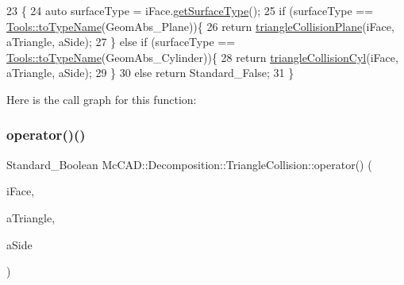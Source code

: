 \begin{DoxyCode}
23                                 \{
24     \textcolor{keyword}{auto} surfaceType = iFace.\hyperlink{classMcCAD_1_1Geometry_1_1Surface_ac81308cae2d3fd458dfa311adea23688}{getSurfaceType}();
25     \textcolor{keywordflow}{if} (surfaceType == \hyperlink{namespaceMcCAD_1_1Tools_a2c3c43d2878c73f69424e7b32f87bb2b}{Tools::toTypeName}(GeomAbs\_Plane))\{
26         \textcolor{keywordflow}{return} \hyperlink{classMcCAD_1_1Decomposition_1_1TriangleCollision_aa9f5d8a29c70ea403e8a690108c31cc7}{triangleCollisionPlane}(iFace, aTriangle, aSide);
27     \} \textcolor{keywordflow}{else} \textcolor{keywordflow}{if} (surfaceType == \hyperlink{namespaceMcCAD_1_1Tools_a2c3c43d2878c73f69424e7b32f87bb2b}{Tools::toTypeName}(GeomAbs\_Cylinder))\{
28         \textcolor{keywordflow}{return} \hyperlink{classMcCAD_1_1Decomposition_1_1TriangleCollision_a80f29dce3e63b4e8c6b54290260c1ca5}{triangleCollisionCyl}(iFace, aTriangle, aSide);
29     \}
30     \textcolor{keywordflow}{else} \textcolor{keywordflow}{return} Standard\_False;
31 \}
\end{DoxyCode}
Here is the call graph for this function\+:
\mbox{\label{classMcCAD_1_1Decomposition_1_1TriangleCollision_af452f50ec7e08c8bc01d7f81f543ce9f}} 
\subsubsection{\texorpdfstring{operator()()}{operator()()}\hspace{0.1cm}{\footnotesize\ttfamily [2/2]}}
{\footnotesize\ttfamily Standard\+\_\+\+Boolean Mc\+C\+A\+D\+::\+Decomposition\+::\+Triangle\+Collision\+::operator() (\begin{DoxyParamCaption}\item[{const \hyperlink{classMcCAD_1_1Geometry_1_1BoundSurface}{Mc\+C\+A\+D\+::\+Geometry\+::\+Bound\+Surface} \&}]{i\+Face,  }\item[{const \hyperlink{classMcCAD_1_1Geometry_1_1MeshTriangle}{Mc\+C\+A\+D\+::\+Geometry\+::\+Mesh\+Triangle} \&}]{a\+Triangle,  }\item[{Standard\+\_\+\+Integer \&}]{a\+Side }\end{DoxyParamCaption})}

